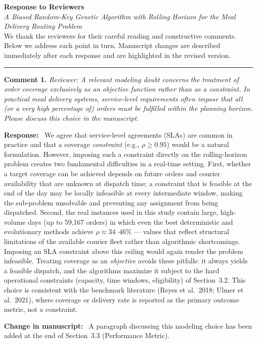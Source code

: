\documentclass[12pt]{article}
\newcommand{\rev}[1]{\textcolor{revcolor}{\textit{Reviewer: #1}}}
\newcommand{\resp}{\noindent\textbf{Response:}\ }
\newcommand{\change}{\noindent\textbf{Change in manuscript:}\ }
\begin{document}
\noindent
\textbf{Response to Reviewers}\\
\textit{A Biased Random-Key Genetic Algorithm with Rolling Horizon
for the Meal Delivery Routing Problem}\\[6pt]

We thank the reviewers for their careful reading and constructive
comments. Below we address each point in turn.
Manuscript changes are described immediately after each response
and are highlighted in the revised version.

\bigskip
\hrule
\bigskip

\noindent\textbf{Comment 1.}
\rev{A relevant modeling doubt concerns the treatment of order
coverage exclusively as an objective function rather than as a
constraint. In practical meal delivery systems, service-level
requirements often impose that all (or a very high percentage of)
orders must be fulfilled within the planning horizon. Please discuss
this choice in the manuscript.}

\resp
We agree that service-level agreements (SLAs) are common in practice
and that a coverage \emph{constraint} (e.g., $\rho \geq 0.95$) would
be a natural formulation. However, imposing such a constraint
directly on the rolling-horizon problem creates two fundamental
difficulties in a real-time setting.
First, whether a target coverage can be achieved depends on future
orders and courier availability that are unknown at dispatch time;
a constraint that is feasible at the end of the day may be locally
infeasible at every intermediate window, making the sub-problem
unsolvable and preventing any assignment from being dispatched.
Second, the real instances used in this study contain large,
high-volume days (up to 59,167 orders) in which even the best
deterministic and evolutionary methods achieve $\rho \approx
34$--$46\%$ — values that reflect structural limitations of the
available courier fleet rather than algorithmic shortcomings.
Imposing an SLA constraint above this ceiling would again render
the problem infeasible.
Treating coverage as an \emph{objective} avoids these pitfalls:
it always yields a feasible dispatch, and the algorithms
maximize it subject to the hard operational constraints
(capacity, time windows, eligibility) of Section~3.2.
This choice is consistent with the benchmark literature
(Reyes et al.\ 2018; Ulmer et al.\ 2021), where coverage or
delivery rate is reported as the primary outcome metric, not
a constraint.

\change
A paragraph discussing this modeling choice has been added at the
end of Section~3.3 (Performance Metric).
\end{document}
